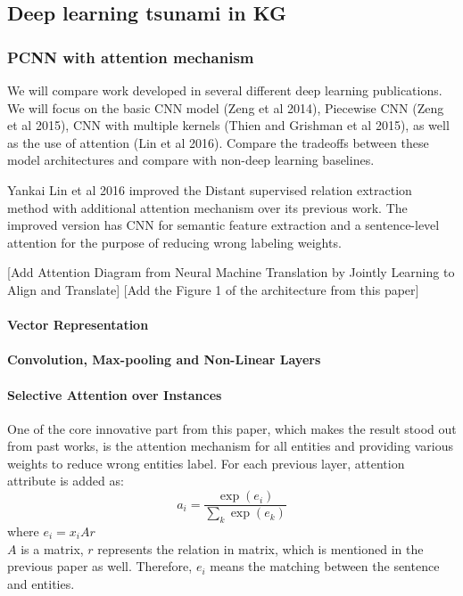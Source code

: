 \documentclass{article}
\begin{document}
\subsection{Deep learning tsunami in KG}

\subsubsection{PCNN with attention mechanism}
	We will compare work developed in several different deep learning publications. We will focus on the basic CNN model (Zeng et al 2014), Piecewise CNN (Zeng et al 2015), CNN with multiple kernels (Thien and Grishman et al 2015), as well as the use of attention (Lin et al 2016). Compare the tradeoffs between these model architectures and compare with non-deep learning baselines. \citet{DBLP:conf/acl/LinSLLS16}
	
	Yankai Lin et al 2016 improved the Distant supervised relation extraction method with additional attention mechanism over its previous work. The improved version has CNN for semantic feature extraction and a sentence-level attention for the purpose of reducing wrong labeling weights. 
	
	[Add Attention Diagram from Neural Machine Translation by Jointly Learning to Align and Translate]
	[Add the Figure 1 of the architecture from this paper]
	
	\paragraph{Vector Representation}
	

	\paragraph{Convolution, Max-pooling and Non-Linear Layers}
		
	
	\paragraph{Selective Attention over Instances}
	One of the core innovative part from this paper, which makes the result stood out from past works, is the attention mechanism for all entities and providing various weights to reduce wrong entities label. For each previous layer, attention attribute is added as:
	\[a_i = \frac{\exp(e_i)}{\displaystyle\sum_{k} \exp(e_k)}\]
	where \(e_i = x_i A r\) \\
	\(A\) is a matrix, \(r\) represents the relation in matrix, which is mentioned in the previous paper as well. Therefore, \(e_i\) means the matching between the sentence and entities.
	
\end{document}
